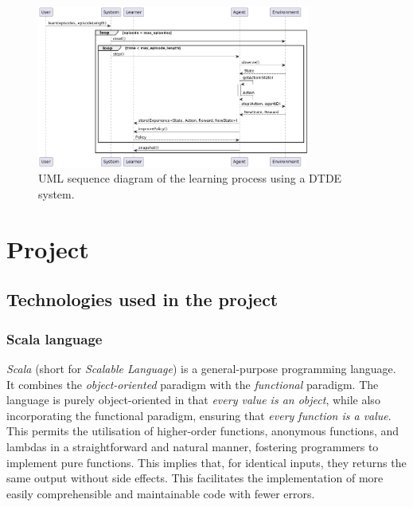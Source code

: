 \documentclass[12pt,a4paper,openright,twoside]{book}
\begin{document}
\begin{figure}[t]
    \centering
    \includegraphics[width=0.8\textwidth]{figures/DTDE-System-Sequence-Diagram.png}
    \caption{UML sequence diagram of the learning process using a DTDE system.}
    \label{fig:dtde-sequence}
\end{figure}

\chapter{Project} 
\label{chap:project}
\section{Technologies used in the project}

\subsection*{Scala language}

\emph{Scala} (short for \emph{Scalable Language}) is a general-purpose programming language. 
    It combines the \emph{object-oriented} paradigm with the \emph{functional} paradigm. The language is purely object-oriented 
    in that \emph{every value is an object}, while also incorporating the functional paradigm, ensuring 
    that \emph{every function is a value}. This permits the utilisation of higher-order functions, anonymous functions, and 
    lambdas in a straightforward and natural manner, fostering programmers to implement pure functions. This implies that, 
    for identical inputs, they returns the same output without side effects. This facilitates the implementation of more easily 
    comprehensible and maintainable code with fewer errors.
\end{document}
